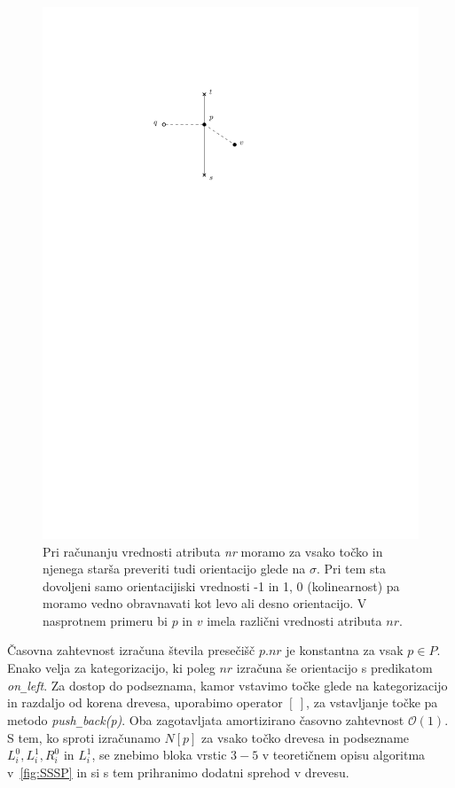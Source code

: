 \documentclass[a4paper, 12pt]{book}
\newcommand{\OO}{\ensuremath{\mathcal{O}}} %
\newcommand{\U}{\texttt{\_}}
\begin{document}
\begin{figure}[htp]
\centerline{\includegraphics[scale=1]{pics/nrSideExample.pdf}}
\caption{Pri računanju vrednosti atributa \textit{nr} moramo za vsako točko in njenega starša preveriti tudi orientacijo glede na $\sigma$. Pri tem sta dovoljeni samo orientacijiski vrednosti -1 in 1, 0 (kolinearnost) pa moramo vedno obravnavati kot levo ali desno orientacijo. V nasprotnem primeru bi $p$ in $v$ imela različni vrednosti atributa $nr$.}
\label{pq-left-right}
\end{figure}

Časovna zahtevnost izračuna števila presečišč $p.nr$ je konstantna za vsak $p\in P$. Enako velja za kategorizacijo, ki poleg $nr$ izračuna še orientacijo s predikatom \textit{on\U left}. Za dostop do podseznama, kamor vstavimo točke glede na kategorizacijo in razdaljo od korena drevesa, uporabimo operator $[\ ]$, za vstavljanje točke pa metodo \textit{push\U back(p)}. Oba zagotavljata amortizirano časovno zahtevnost $\OO(1)$. S tem, ko sproti izračunamo $N[p]$ za vsako točko drevesa in podsezname $L_i^0, L_i^1, R_i^0$ in $L_i^1$, se znebimo bloka vrstic $3-5$ v teoretičnem opisu algoritma v~\ref{fig:SSSP} in si s tem prihranimo dodatni sprehod v drevesu.
\end{document}
